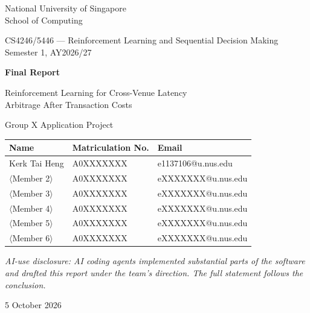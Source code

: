 \documentclass[12pt,a4paper]{article}
\begin{document}

\begin{titlepage}
\centering
\vspace*{1.2cm}
{\large National University of Singapore \\ School of Computing \par}
\vspace{0.4cm}
{\large CS4246/5446 --- Reinforcement Learning and Sequential Decision Making \\
Semester 1, AY2026/27 \par}
\vspace{1.4cm}
{\LARGE\bfseries Final Report \par}
\vspace{0.5cm}
{\Large Reinforcement Learning for Cross-Venue Latency\\[2pt]
Arbitrage After Transaction Costs \par}
\vspace{1.6cm}
{\large Group X \quad\textbar\quad Application Project \par}
\vspace{1.1cm}

\begin{tabular}{@{}lll@{}}
\toprule
\textbf{Name} & \textbf{Matriculation No.} & \textbf{Email} \\
\midrule
Kerk Tai Heng      & A0XXXXXXX & e1137106@u.nus.edu \\
$\langle$Member 2$\rangle$ & A0XXXXXXX & eXXXXXXX@u.nus.edu \\
$\langle$Member 3$\rangle$ & A0XXXXXXX & eXXXXXXX@u.nus.edu \\
$\langle$Member 4$\rangle$ & A0XXXXXXX & eXXXXXXX@u.nus.edu \\
$\langle$Member 5$\rangle$ & A0XXXXXXX & eXXXXXXX@u.nus.edu \\
$\langle$Member 6$\rangle$ & A0XXXXXXX & eXXXXXXX@u.nus.edu \\
\bottomrule
\end{tabular}

\vspace{0.8cm}
{\normalsize\textit{AI-use disclosure: AI coding agents implemented substantial parts of the
software and drafted this report under the team's direction. The full statement follows the
conclusion.}\par}

\vfill
{\normalsize 5 October 2026 \par}
\end{titlepage}
\end{document}
